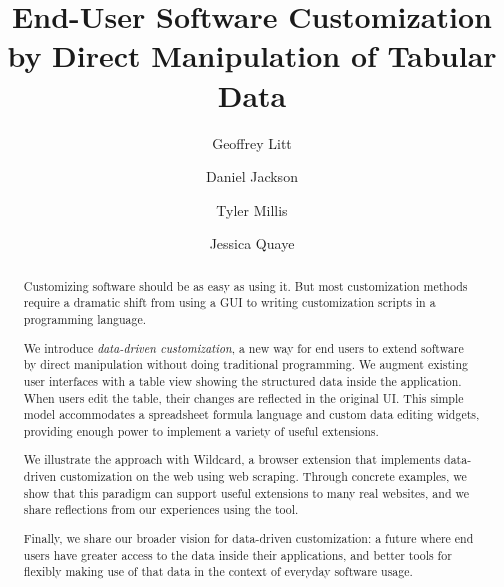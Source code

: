 \documentclass[sigplan,screen,10pt,anonymous,review]{acmart}
\begin{document}
\title{End-User Software Customization by Direct Manipulation of Tabular
Data}


\author{Geoffrey Litt}

\author{Daniel Jackson}

\author{Tyler Millis}

\author{Jessica Quaye}


\begin{abstract}
  Customizing software should be as easy as using it. But most
  customization methods require a dramatic shift from using a GUI to
  writing customization scripts in a programming language.

  We introduce \emph{data-driven customization}, a new way for end users
  to extend software by direct manipulation without doing traditional
  programming. We augment existing user interfaces with a table view
  showing the structured data inside the application. When users edit
  the table, their changes are reflected in the original UI. This simple
  model accommodates a spreadsheet formula language and custom data
  editing widgets, providing enough power to implement a variety of
  useful extensions.

  We illustrate the approach with Wildcard, a browser extension that
  implements data-driven customization on the web using web scraping.
  Through concrete examples, we show that this paradigm can support
  useful extensions to many real websites, and we share reflections from
  our experiences using the tool.

  Finally, we share our broader vision for data-driven customization: a
  future where end users have greater access to the data inside their
  applications, and better tools for flexibly making use of that data in
  the context of everyday software usage.
\end{abstract}
\end{document}
